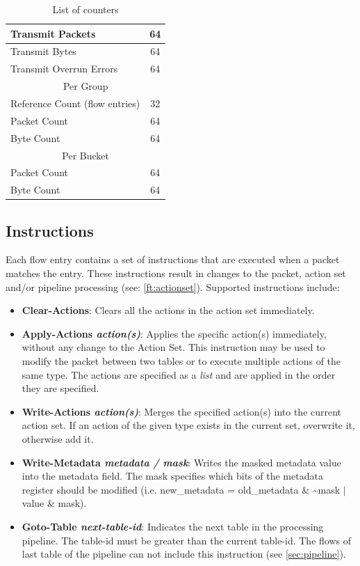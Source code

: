 \documentclass[10pt]{article}
\begin{document}
\begin{table}[!hbp]
\begin{tabular}{ |l|c| }
\hline Transmit Packets & 64 \\
\hline Transmit Bytes & 64 \\
\hline Transmit Overrun Errors & 64\\
\hline \multicolumn{2}{|c|}{Per Group} \\
\hline Reference Count (flow entries) & 32 \\
\hline Packet Count & 64 \\
\hline Byte Count & 64 \\
\hline \multicolumn{2}{|c|}{Per Bucket} \\
\hline Packet Count & 64 \\
\hline Byte Count & 64 \\
\hline
\end{tabular}
\caption{List of counters}
\label{table:counters}
\end{table}

\subsection{Instructions}
\label{ft:instructions}
Each flow entry contains a set of instructions that are executed when a packet matches the entry. These instructions result in changes to the packet, action set and/or pipeline processing (see: \ref{ft:actionset}). Supported instructions include:
\begin{itemize} 
\item \textbf{Clear-Actions}: Clears all the actions in the action set immediately.
\item \textbf{Apply-Actions \textit{action(s)}}: Applies the specific action(s) immediately, without any change to the Action Set. This instruction may be used to modify the packet between two tables or to execute multiple actions of the same type. The actions are specified as a \emph{list} and are applied in the order they are specified.
\item \textbf{Write-Actions \textit{action(s)}}: Merges the specified action(s) into the current action set.  If an action of the given type exists in the current set, overwrite it, otherwise add it.
\item \textbf{Write-Metadata \textit{metadata / mask}}: Writes the masked metadata value into the metadata field. The mask specifies which bits of the metadata register should be modified (i.e. new\_metadata = old\_metadata \& \~{}mask $|$ value \& mask).
\item \textbf{Goto-Table \textit{next-table-id}}: Indicates the next table in the processing pipeline. The table-id must be greater than the current table-id. The flows of last table of the pipeline can not include this instruction (see \ref{sec:pipeline}).
\end{itemize} 
\end{document}
